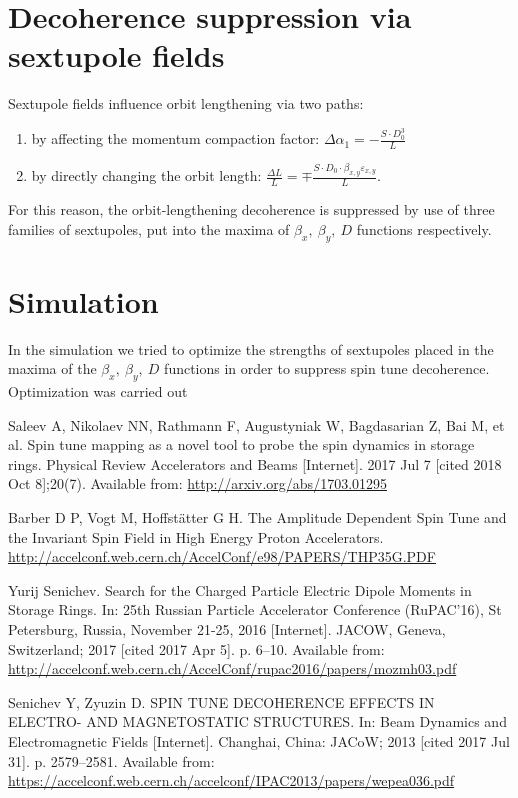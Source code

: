 \documentclass{article}
\begin{document}
\section{Decoherence suppression via sextupole fields}
Sextupole fields influence orbit lengthening via two paths:
\begin{enumerate}
\item by affecting the momentum compaction factor: $\Delta\alpha_1 = -\frac{S\cdot D_0^3}{L}$
\item by directly changing the orbit length: $\frac{\Delta L}{L} = \mp \frac{S\cdot D_0\cdot \beta_{x,y}\varepsilon_{x,y}}{L}$.
\end{enumerate}

For this reason, the orbit-lengthening decoherence is suppressed by use of three families of sextupoles, put into the maxima of $\beta_x,~\beta_y,~D$ functions respectively.

\section{Simulation}
In the simulation we tried to optimize the strengths of sextupoles placed in the maxima of the $\beta_x,~\beta_y,~D$ functions in order to suppress spin tune decoherence. Optimization was carried out 


\begin{thebibliography}{99}
  Saleev A, Nikolaev NN, Rathmann F, Augustyniak W, Bagdasarian Z, Bai M, et al. Spin tune mapping as a novel tool to probe the spin dynamics in storage rings. Physical Review Accelerators and Beams [Internet]. 2017 Jul 7 [cited 2018 Oct 8];20(7). Available from: \url{http://arxiv.org/abs/1703.01295}
  
  Barber D P, Vogt M, Hoffst\"atter G H. The Amplitude Dependent Spin Tune and the Invariant Spin Field in High Energy Proton Accelerators. \url{http://accelconf.web.cern.ch/AccelConf/e98/PAPERS/THP35G.PDF}

  Yurij Senichev. Search for the Charged Particle Electric Dipole Moments in Storage Rings. In: 25th Russian Particle Accelerator Conference (RuPAC’16), St Petersburg, Russia, November 21-25, 2016 [Internet]. JACOW, Geneva, Switzerland; 2017 [cited 2017 Apr 5]. p. 6–10. Available from: \url{http://accelconf.web.cern.ch/AccelConf/rupac2016/papers/mozmh03.pdf}

  Senichev Y, Zyuzin D. SPIN TUNE DECOHERENCE EFFECTS IN ELECTRO- AND  MAGNETOSTATIC STRUCTURES. In: Beam Dynamics and Electromagnetic Fields [Internet]. Changhai, China: JACoW; 2013 [cited 2017 Jul 31]. p. 2579--2581. Available from: \url{https://accelconf.web.cern.ch/accelconf/IPAC2013/papers/wepea036.pdf}
\end{thebibliography}
\end{document}
